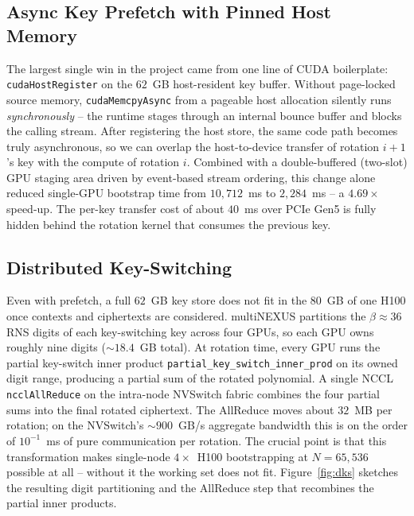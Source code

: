\documentclass[conference]{IEEEtran}
\begin{document}
\subsection{Async Key Prefetch with Pinned Host Memory}

The largest single win in the project came from one line of CUDA
boilerplate: \texttt{cudaHostRegister} on the $62$~GB host-resident
key buffer. Without page-locked source memory,
\texttt{cudaMemcpyAsync} from a pageable host allocation silently runs
\emph{synchronously} -- the runtime stages through an internal bounce
buffer and blocks the calling stream. After registering the host store,
the same code path becomes truly asynchronous, so we can overlap the
host-to-device transfer of rotation $i+1$'s key with the compute of
rotation $i$. Combined with a double-buffered (two-slot) GPU staging
area driven by event-based stream ordering, this change alone reduced
single-GPU bootstrap time from $10{,}712$~ms to $2{,}284$~ms -- a
$4.69\times$ speed-up. The per-key transfer cost of about $40$~ms over
PCIe Gen5 is fully hidden behind the rotation kernel that consumes the
previous key.

\subsection{Distributed Key-Switching}

Even with prefetch, a full $62$~GB key store does not fit in the
$80$~GB of one H100 once contexts and ciphertexts are considered.
multiNEXUS partitions the $\beta \approx 36$ RNS digits of each
key-switching key across four GPUs, so each GPU owns roughly nine
digits ($\sim 18.4$~GB total). At rotation time, every GPU runs the
partial key-switch inner product
\texttt{partial\_key\_switch\_inner\_prod} on its owned digit range,
producing a partial sum of the rotated polynomial. A single NCCL
\texttt{ncclAllReduce} on the intra-node NVSwitch fabric combines the
four partial sums into the final rotated ciphertext. The AllReduce
moves about $32$~MB per rotation; on the NVSwitch's $\sim$$900$~GB/s
aggregate bandwidth this is on the order of $10^{-1}$~ms of pure
communication per rotation. The crucial point is that this
transformation makes single-node $4\times$~H100 bootstrapping at
$N{=}65{,}536$ possible at all -- without it the working set does not
fit. Figure~\ref{fig:dks} sketches the resulting digit partitioning
and the AllReduce step that recombines the partial inner products.
\end{document}
